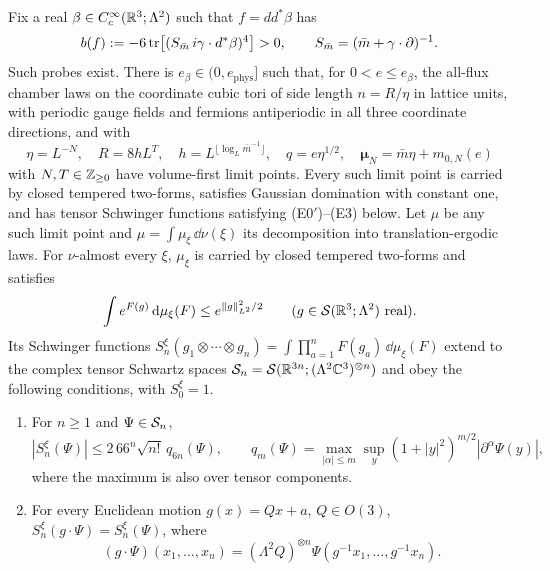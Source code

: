 \begin{theorem}
Fix a real $\beta\in C_c^\infty(\mathbb R^3;\Lambda^2)$ such that
$f=dd^*\beta$ has
\begin{equation}\label{eq:positive-coefficient}
 b(f):=-6\operatorname{tr}\bigl[(S_{\bar m}\,i\gamma\cdot d^*\beta)^4\bigr]>0,
 \qquad S_{\bar m}=(\bar m+\gamma\cdot\partial)^{-1}.
\end{equation}
Such probes exist. There is $e_\beta\in(0,e_{\mathrm{phys}}]$ such that, for $0<e\le e_\beta$,
the all-flux chamber laws on the coordinate cubic tori of side
length $n=R/\eta$ in lattice units, with periodic gauge fields and fermions
antiperiodic in all three coordinate directions, and with
\begin{equation}\label{eq:cutoff-scales}
 \eta=L^{-N},\quad R=8hL^T,\quad
 h=L^{\lfloor\log_L\bar m^{-1}\rfloor},\quad
 q=e\eta^{1/2},\quad \boldsymbol\mu_N=\bar m\eta+m_{0,N}(e)
\end{equation}
with $N,T\in\mathbb Z_{\ge0}$ have volume-first limit points.
Every such limit point is carried by closed tempered two-forms,
satisfies Gaussian domination with constant one, and has tensor
Schwinger functions satisfying \textup{(E0$'$)}--\textup{(E3)} below.
Let $\mu$ be any such limit point and
$\mu=\int\mu_\xi\,\dd\nu(\xi)$ its decomposition into
translation-ergodic laws. For $\nu$-almost every $\xi$, $\mu_\xi$ is
carried by closed tempered two-forms and satisfies
\begin{equation}\label{eq:main-domination}
 \int e^{F(g)}\,\mathrm d\mu_\xi(F)\le e^{\|g\|_{L^2}^2/2}
 \qquad(g\in\mathcal S(\mathbb R^3;\Lambda^2)\text{ real}).
\end{equation}
Its Schwinger functions
$S_n^\xi(g_1\otimes\cdots\otimes g_n)
=\int\prod_{a=1}^nF(g_a)\,\dd\mu_\xi(F)$
extend to the complex tensor Schwartz spaces
$\mathcal S_n=\mathcal S(\mathbb R^{3n};(\Lambda^2\mathbb C^3)^{\otimes n})$
and obey the following conditions, with $S_0^\xi=1$.
\begin{enumerate}
\item[\textup{(E0$'$)}] For $n\ge1$ and $\Psi\in\mathcal S_n$,
\begin{equation}\label{eq:main-growth}
 |S_n^\xi(\Psi)|\le2\,66^n\sqrt{n!}\,q_{6n}(\Psi),\qquad
 q_m(\Psi)=\max_{|\alpha|\le m}\sup_y
 (1+|y|^2)^{m/2}|\partial^\alpha\Psi(y)|,
\end{equation}
where the maximum is also over tensor components.
\item[\textup{(E1)}] For every Euclidean motion $g(x)=Qx+a$,
$Q\in O(3)$, $S_n^\xi(g\cdot\Psi)=S_n^\xi(\Psi)$, where
\[
 (g\cdot\Psi)(x_1,\ldots,x_n)
 =(\Lambda^2Q)^{\otimes n}\Psi(g^{-1}x_1,\ldots,g^{-1}x_n).
\]

\end{enumerate}
\end{theorem}
